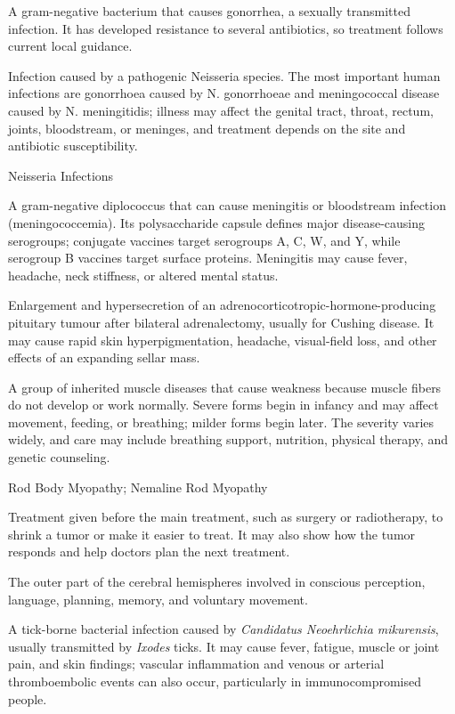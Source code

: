  A gram-negative bacterium that causes gonorrhea, a sexually transmitted infection. It has developed resistance to several antibiotics, so treatment follows current local guidance.

 Infection caused by a pathogenic Neisseria species. The most important human infections are gonorrhoea caused by N. gonorrhoeae and meningococcal disease caused by N. meningitidis; illness may affect the genital tract, throat, rectum, joints, bloodstream, or meninges, and treatment depends on the site and antibiotic susceptibility.

\synonyms
Neisseria Infections

 A gram-negative diplococcus that can cause meningitis or bloodstream infection (meningococcemia). Its polysaccharide capsule defines major disease-causing serogroups; conjugate vaccines target serogroups A, C, W, and Y, while serogroup B vaccines target surface proteins. Meningitis may cause fever, headache, neck stiffness, or altered mental status.

 Enlargement and hypersecretion of an adrenocorticotropic-hormone-producing pituitary
tumour after bilateral adrenalectomy, usually for Cushing disease. It may cause rapid
skin hyperpigmentation, headache, visual-field loss, and other effects of an expanding
sellar mass.

 A group of inherited muscle diseases that cause weakness because muscle fibers do not develop or work normally. Severe forms begin in infancy and may affect movement, feeding, or breathing; milder forms begin later. The severity varies widely, and care may include breathing support, nutrition, physical therapy, and genetic counseling.

\synonyms
Rod Body Myopathy; Nemaline Rod Myopathy

 Treatment given before the main treatment, such as surgery or radiotherapy, to shrink a tumor or make it easier to treat. It may also show how the tumor responds and help doctors plan the next treatment.

 The outer part of the cerebral hemispheres involved in conscious perception, language, planning, memory, and voluntary movement.

 A tick-borne bacterial infection caused by \textit{Candidatus Neoehrlichia mikurensis}, usually transmitted by \textit{Ixodes} ticks.
It may cause fever, fatigue, muscle or joint pain, and skin findings; vascular
inflammation and venous or arterial thromboembolic events can also occur,
particularly in immunocompromised people.

